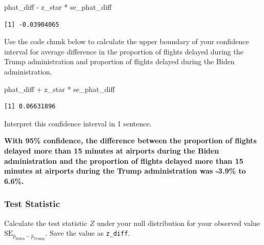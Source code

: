 \documentclass[
  letterpaper,
  DIV=11,
  numbers=noendperiod]{scrartcl}
\newenvironment{Shaded}{\begin{snugshade}}{\end{snugshade}}
\newcommand{\NormalTok}[1]{\textcolor[rgb]{0.00,0.23,0.31}{#1}}
\newcommand{\SpecialCharTok}[1]{\textcolor[rgb]{0.37,0.37,0.37}{#1}}
\begin{document}
\begin{Shaded}
\begin{Highlighting}[]
\NormalTok{phat\_diff }\SpecialCharTok{{-}}\NormalTok{ z\_star }\SpecialCharTok{*}\NormalTok{ se\_phat\_diff}
\end{Highlighting}
\end{Shaded}

\begin{verbatim}
[1] -0.03904065
\end{verbatim}

Use the code chunk below to calculate the upper boundary of your
confidence interval for average difference in the proportion of flights
delayed during the Trump administration and proportion of flights
delayed during the Biden administration.

\begin{Shaded}
\begin{Highlighting}[]
\NormalTok{phat\_diff }\SpecialCharTok{+}\NormalTok{ z\_star }\SpecialCharTok{*}\NormalTok{ se\_phat\_diff}
\end{Highlighting}
\end{Shaded}

\begin{verbatim}
[1] 0.06631896
\end{verbatim}

Interpret this confidence interval in 1 sentence.

\begin{tcolorbox}[enhanced jigsaw, colback=white, breakable, arc=.35mm, left=2mm, colframe=quarto-callout-warning-color-frame, opacityback=0, rightrule=.15mm, toprule=.15mm, bottomrule=.15mm, leftrule=.75mm]

\textbf{With 95\% confidence, the difference between the proportion of
flights delayed more than 15 minutes at airports during the Biden
administration and the proportion of flights delayed more than 15
minutes at airports during the Trump administration was -3.9\% to
6.6\%.}

\end{tcolorbox}

\subsubsection{Test Statistic}\label{test-statistic}

Calculate the test statistic \(Z\) under your null distribution for your
observed value
\(\text{SE}_{\hat{p}_{\text{Biden}}-\hat{p}_{\text{Trump}}}\). Save the
value as \texttt{z\_diff}.
\end{document}
